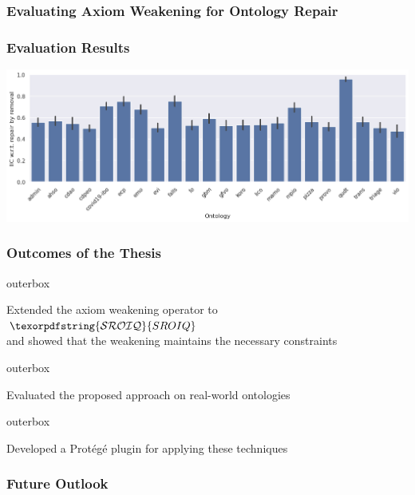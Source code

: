 \documentclass[aspectratio=169]{beamer}
\newcommand{\SROIQ}{\ensuremath{\texorpdfstring{\mathcal{SROIQ}}{SROIQ}}\xspace}
\newlength{\offsetpage}
\newenvironment{narrowpage}[1][5mm]{
  \setlength{\offsetpage}{#1}
  \begin{adjustwidth}{\offsetpage}{\offsetpage}
  \addtolength{\textwidth}{-2\offsetpage}
}{\end{adjustwidth}}
\newenvironment{items}{\begin{narrowpage}\vfill}{\end{narrowpage}}
\newenvironment{oitem}[1][\scriptsize\raisebox{0.6mm}{\color{unibzblue} $\blacktriangleright$}]{\hfill\begin{beamercolorbox}[rounded=true,colsep=2mm]{outerbox}\parbox[t]{5mm}{#1}\begin{minipage}[t]{\textwidth}}{\end{minipage}\end{beamercolorbox}\hfill\vfill}
\begin{document}
\begin{frame}
  \frametitle{Evaluating Axiom Weakening for Ontology Repair}
\end{frame}

\begin{frame}
  \frametitle{Evaluation Results}
  \includegraphics[width=\textwidth]{resources/iic-remove-ontology-bar.png}
\end{frame}

\begin{frame}
  \frametitle{Outcomes of the Thesis}
  \begin{items}
    \begin{oitem}
      Extended the axiom weakening operator to \SROIQ \\
      {\footnotesize and showed that the weakening maintains the necessary constraints}
    \end{oitem}
    \begin{oitem}
      Evaluated the proposed approach on real-world ontologies
    \end{oitem}
    \begin{oitem}
      Developed a Protégé plugin for applying these techniques
    \end{oitem}
  \end{items}
\end{frame}

\begin{frame}
  \frametitle{Future Outlook}
\end{frame}

{
\begin{frame}[plain]{}
\end{frame}
}
\end{document}
